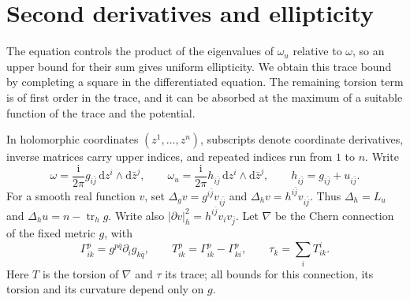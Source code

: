 \section{Second derivatives and ellipticity}

The equation controls the product of the eigenvalues of $\omega_u$ relative to $\omega$, so an upper bound for their sum gives uniform ellipticity. We obtain this trace bound by completing a square in the differentiated equation. The remaining torsion term is of first order in the trace, and it can be absorbed at the maximum of a suitable function of the trace and the potential.

In holomorphic coordinates $(z^1,\ldots,z^n)$, subscripts denote coordinate derivatives, inverse matrices carry upper indices, and repeated indices run from $1$ to $n$. Write
\[
 \omega=\frac{\mathrm i}{2\pi}g_{i\bar j}\,\mathrm{d}z^i\wedge \mathrm{d}\bar z^j,
 \qquad \omega_u=\frac{\mathrm i}{2\pi}h_{i\bar j}\,\mathrm{d}z^i\wedge \mathrm{d}\bar z^j,
 \qquad h_{i\bar j}=g_{i\bar j}+u_{i\bar j}.
\]
For a smooth real function $v$, set $\Delta_gv=g^{i\bar j}v_{i\bar j}$ and $\Delta_hv=h^{i\bar j}v_{i\bar j}$. Thus $\Delta_h=L_u$ and $\Delta_hu=n-\operatorname{tr}_hg$. Write also $|\partial v|_h^2=h^{i\bar j}v_i v_{\bar j}$. Let $\nabla$ be the Chern connection of the fixed metric $g$, with
\[
 \Gamma_{ik}^p=g^{p\bar q}\partial_i g_{k\bar q},\qquad
 T_{ik}^p=\Gamma_{ik}^p-\Gamma_{ki}^p,\qquad
 \tau_k=\sum_iT_{ik}^i.
\]
Here $T$ is the torsion of $\nabla$ and $\tau$ its trace; all bounds for this connection, its torsion and its curvature depend only on $g$.

